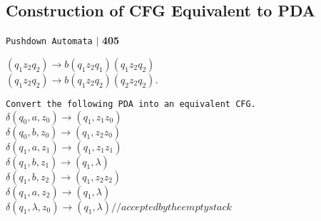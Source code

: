 \documentclass[9pt]{beamer}
\begin{document}
\begin{frame}
\section*{Construction of CFG Equivalent to PDA}
\begin{flushright}
 \texttt{Pushdown Automata} \hspace*{0.10cm}\textbf{$|$} \textbf{405}\hspace*{0.5cm}
\end{flushright}

\vspace*{0.5cm}
\begin{center}
   $(q_1 z_2 q_2) \rightarrow b(q_1 z_2 q_1) (q_1 z_2 q_2)$\\
   $(q_1 z_2 q_2) \rightarrow b(q_1 z_2 q_2) (q_2 z_2 q_2)$.\\
\end{center}

\hspace*{0.1cm} \texttt{\small{Convert the following PDA into an equivalent CFG.}}\\


\hspace*{2cm} $\delta(q_0, a, z_0) \rightarrow (q_1, z_1z_0)$ \\
\hspace*{2cm} $\delta(q_0, b, z_0) \rightarrow (q_1, z_2z_0)$\\
\hspace*{2cm} $\delta(q_1, a, z_1) \rightarrow (q_1, z_1z_1)$\\
\hspace*{2cm} $\delta(q_1, b, z_1) \rightarrow  (q_1, \lambda)$\\
\hspace*{2cm} $\delta(q_1, b, z_2) \rightarrow (q_1, z_2z_2)$\\
\hspace*{2cm} $\delta(q_1, a, z_2) \rightarrow (q_1, \lambda)$\\
\hspace*{2cm} $\delta(q_1, \lambda, z_0) \rightarrow (q_1, \lambda) // accepted by the empty stack$ \\

\vspace*{0.5cm}
\end{frame}
\end{document}
